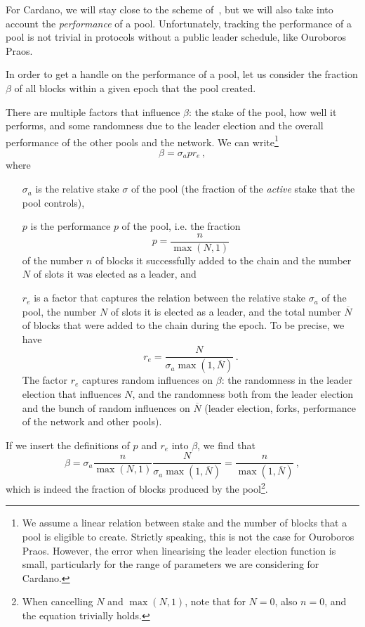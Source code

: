 \documentclass[11pt,a4paper,dvipsnames,twosided]{article}
\newcommand{\citep}[1]{\cite{#1}}
\newcommand\Nbar{\overline{N}}
\begin{document}
For Cardano, we will stay close to the scheme of~\citep{bkks2018}, but we will
also take into account the \emph{performance} of a pool. Unfortunately, tracking
the performance of a pool is not trivial in protocols without a public leader
schedule, like Ouroboros Praos.

In order to get a handle on the performance of a pool, let us consider the
fraction \(\beta\) of all blocks within a given epoch that the pool created.

There are multiple factors that influence \(\beta\): the stake of the pool, how
well it performs, and some randomness due to the leader election and the overall
performance of the other pools and the network. We can write\footnote{We assume
  a linear relation between stake and the number of blocks that a pool is
  eligible to create. Strictly speaking, this is not the case for Ouroboros
  Praos. However, the error when linearising the leader election function is
  small, particularly for the range of parameters we are considering for
  Cardano.}
\[\beta = \sigma_a p r_e \,,\]
where
\begin{enumerate}
\item[\(\sigma_a\)] is the relative stake \(\sigma\) of the pool (the fraction of
  the \emph{active} stake that the pool controls),
\item[\(p\)] is the performance \(p\) of the pool, i.e. the fraction
  \[
  p = \frac{n}{\max(N,1)}
  \]
  of the number \(n\) of blocks it successfully added to the chain and the
  number \(N\) of slots it was elected as a leader, and
\item[\(r_e\)] is a factor that captures the relation between the relative stake
  \(\sigma_a\) of the pool, the number \(N\) of slots it is elected as a leader,
  and the total number \(\Nbar\) of blocks that were added to the chain during
  the epoch. To be precise, we have
  \[r_e = \frac{N}{\sigma_a \max(1, \Nbar)}\,.\]
  The factor \(r_e\) captures random influences on \(\beta\): the
  randomness in the leader election that influences \(N\), and the randomness
  both from the leader election and the bunch of random influences on
  \(\Nbar\) (leader election, forks, performance of the network and other
  pools).
\end{enumerate}

If we insert the definitions of \(p\) and \(r_e\) into \(\beta\), we find that
\[
\beta = \sigma_a \frac{n}{\max(N,1)} \frac{N}{\sigma_a \max(1, \Nbar)}
= \frac{n}{\max(1, \Nbar)}\,,
\]
which is indeed the fraction of blocks produced by the pool\footnote{When
  cancelling \(N\) and \(\max(N,1)\), note that for \(N=0\), also \(n=0\), and
  the equation trivially holds.}.
\end{document}

